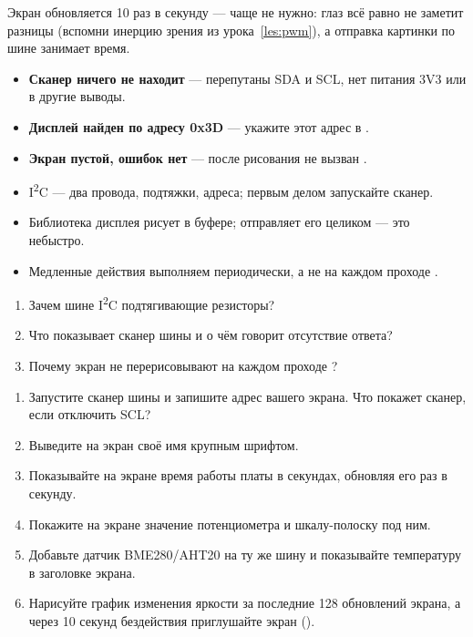 
Экран обновляется 10 раз в секунду --- чаще не нужно: глаз всё равно не заметит разницы
(вспомни инерцию зрения из урока~\ref{les:pwm}), а отправка картинки по шине занимает время.


\begin{trouble}
\begin{itemize}[leftmargin=*]
  \item \textbf{Сканер ничего не находит} --- перепутаны SDA и SCL, нет питания 3V3 или в  другие выводы.
  \item \textbf{Дисплей найден по адресу 0x3D} --- укажите этот адрес в .
  \item \textbf{Экран пустой, ошибок нет} --- после рисования не вызван .
\end{itemize}
\end{trouble}

\begin{summary}
\begin{itemize}[leftmargin=*]
  \item I\textsuperscript{2}C --- два провода, подтяжки, адреса; первым делом запускайте сканер.
  \item Библиотека дисплея рисует в буфере;  отправляет его целиком --- это небыстро.
  \item Медленные действия выполняем периодически, а не на каждом проходе .
\end{itemize}
\end{summary}

\begin{selfcheck}
\begin{enumerate}
  \item Зачем шине I\textsuperscript{2}C подтягивающие резисторы?
  \item Что показывает сканер шины и о чём говорит отсутствие ответа?
  \item Почему экран не перерисовывают на каждом проходе ?
\end{enumerate}
\end{selfcheck}

\begin{tasks}
\begin{enumerate}
\item {} Запустите сканер шины и запишите адрес вашего экрана. Что покажет сканер, если отключить SCL?
\item {} Выведите на экран своё имя крупным шрифтом.
\item {} Показывайте на экране время работы платы в секундах, обновляя его раз в секунду.
\item {} Покажите на экране значение потенциометра и шкалу-полоску под ним.
\item {} Добавьте датчик BME280/AHT20 на ту же шину и показывайте температуру в заголовке экрана.
\item {} Нарисуйте график изменения яркости за последние 128 обновлений экрана, а через 10 секунд бездействия приглушайте экран ().
\end{enumerate}
\end{tasks}
